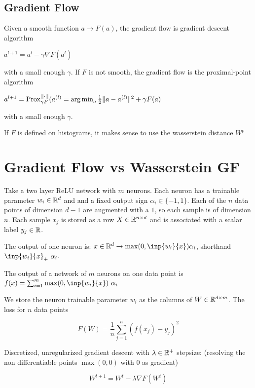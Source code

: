 \subsection{Gradient Flow}

Given a smooth function $a \rightarrow F(a)$, the gradient flow is gradient descent algorithm

$a^{l+1} = a^l - \gamma \nabla F(a^l)$

with a small enough $\gamma$. If $F$ is not smooth, the gradient flow is the proximal-point algorithm

$a^{l+1} = \operatorname{Prox}^{||\cdot ||}_{\gamma F}(a^{(l)} = \operatorname*{arg\,min}_a \frac{1}{2} \lVert a - a^{(l)}\rVert^2 + \gamma F(a)$

with a small enough $\gamma$.

If $F$ is defined on histograms, it makes sense to use the wasserstein distance $W^p$

\section{Gradient Flow vs Wasserstein GF}

Take a two layer ReLU network with $m$ neurons. Each neuron has a trainable parameter $w_i \in \mathbb{R}^d$ and and a fixed output sign $\alpha_i \in \{-1, 1\}$. Each of the $n$ data points of dimension $d-1$ are augmented with a $1$, so each sample is of dimension $n$. Each sample $x_j$ is stored as a row $X \in \mathbb{R}^{n \times d}$  and is associated with a scalar label $y_j \in \mathbb{R}$.

The output of one neuron is: $x \in \R^d \rightarrow \max(0, \inp{w_i}{x}) \alpha_i$, shorthand $\inp{w_i}{x}_+ ~ \alpha_i$.

The output of a network of $m$ neurons on one data point is $f(x) = \sum_{i=1}^{m} \max(0, \inp{w_i}{x}) ~ \alpha_i$

We store the neuron trainable parameter $w_i$ as the columns of $W \in \mathbb{R}^{d \times m}$. The loss for $n$ data points

\begin{equation}
	F(W) = \frac{1}{n} \sum_{j=1}^{n} \left(f(x_j) - y_j\right)^2
\end{equation}

Discretized, unregularized gradient descent with $\lambda \in \mathbb{R}^+$ stepsize: (resolving the non differentiable points $\max(0, 0)$ with 0 as gradient)

\begin{equation}
	W^{t+1} = W^t - \lambda \nabla F(W^t)
\end{equation}

